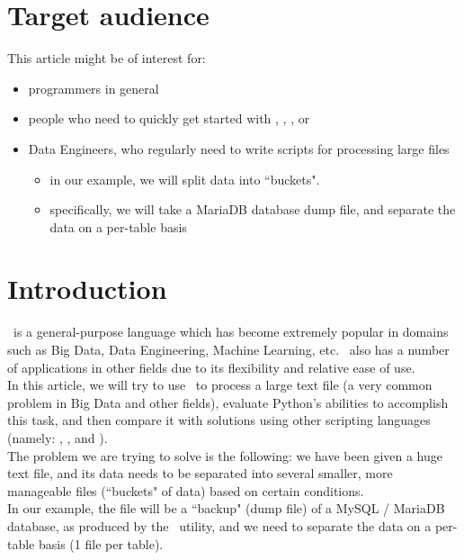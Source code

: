 
\renewcommand{\currentPart}{Preamble}


\section*{Target audience}

This article might be of interest for:
\begin{itemize}
	\item programmers in general
	\item people who need to quickly get started with \python, \awk, \perl, or \julia
	\item Data Engineers, who regularly need to write scripts for processing large files
	\begin{itemize}
		\item in our example, we will split data into ``buckets".
		\item specifically, we will take a MariaDB database dump file, and separate the data on a per-table basis
	\end{itemize}
\end{itemize}




\newpage

\section*{Introduction}

\python\ is a general-purpose language which has become extremely popular in domains such as Big Data, Data Engineering, Machine Learning, etc. \python\ also has a number of applications in other fields due to its flexibility and relative ease of use. \\

In this article, we will try to use \python\ to process a large text file (a very common problem in Big Data and other fields), evaluate Python's abilities to accomplish this task, and then compare it with solutions using other scripting languages (namely: \awk, \perl, and \julia). \\

The problem we are trying to solve is the following: we have been given a huge text file, and its data needs to be separated into several smaller, more manageable files (``buckets" of data) based on certain conditions. \\

In our example, the file will be a ``backup" (dump file) of a MySQL / MariaDB database, as produced by the \mysqldump\ utility, and we need to separate the data on a per-table basis (1 file per table). \\

